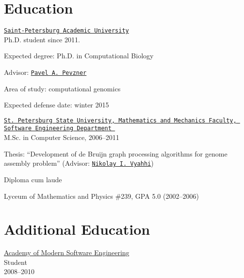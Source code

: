 \section{Education}
%
\href{http://spbau.ru/}{\tt Saint-Petersburg Academic University}\\
  Ph.D. student since 2011. 
\begin{innerlist}
  \item Expected degree: Ph.D. in Computational Biology
  \item Advisor: \href{http://cseweb.ucsd.edu/~ppevzner/}{\tt Pavel A.~Pevzner}
  \item Area of study: computational genomics
  \item Expected defense date: winter 2015
\end{innerlist}

\blankline 

\href{http://www.math.spbu.ru/en/index.html}{\tt St.~Petersburg State University, Mathematics and Mechanics Faculty, Software Engineering Department 
}\\
  M.Sc. in Computer Science, 2006--2011 %
\begin{innerlist}
  \item Thesis: ``Development of de Bruijn graph processing algorithms
        for genome assembly problem'' (Advisor: \href{http://spbsu.ru/vyahhi/}{\tt Nikolay I.~Vyahhi})
  \item Diploma cum laude
\end{innerlist}

\blankline

Lyceum of Mathematics and Physics \#239, GPA 5.0 (2002--2006)

\section{Additional Education}
\href{http://www.amse.ru/}{Academy of Modern Software Engineering}\\
      Student\\
      2008--2010

\blankline




